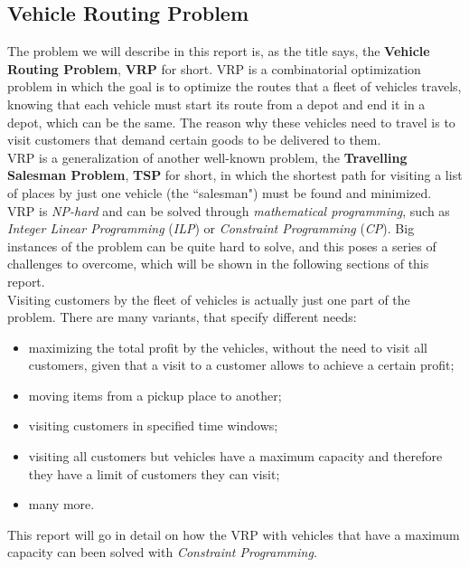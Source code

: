\documentclass[../main.tex]{subfiles}
\begin{document}
\subsection{Vehicle Routing Problem}
\label{subsec:vehicle-routing-problem}
The problem we will describe in this report is, as the title says, the \textbf{Vehicle Routing Problem}, \textbf{VRP} for short.
VRP is a combinatorial optimization problem in which the goal is to optimize the routes that a fleet of vehicles travels, knowing that each vehicle must start its route
from a depot and end it in a depot, which can be the same. The reason why these vehicles need to travel is to visit customers that demand certain goods to be delivered to them.\\
VRP is a generalization of another well-known problem, the \textbf{Travelling Salesman Problem}, \textbf{TSP} for short, in which the shortest path for visiting a list of places by just one vehicle (the ``salesman") must be found and minimized.
VRP is \textit{NP-hard} and can be solved through \textit{mathematical programming}, such as \textit{Integer Linear Programming} (\textit{ILP}) or \textit{Constraint Programming} (\textit{CP}).
Big instances of the problem can be quite hard to solve, and this poses a series of challenges to overcome, which will be shown in the following sections of this report.\\
Visiting customers by the fleet of vehicles is actually just one part of the problem. There are many variants, that specify different needs:
\begin{itemize}
    \item maximizing the total profit by the vehicles, without the need to visit all customers, given that a visit to a customer allows to achieve a certain profit;
    \item moving items from a pickup place to another;
    \item visiting customers in specified time windows;
    \item visiting all customers but vehicles have a maximum capacity and therefore they have a limit of customers they can visit;
    \item many more.
\end{itemize}
This report will go in detail on how the VRP with vehicles that have a maximum capacity can been solved with \textit{Constraint Programming}.
\end{document}
